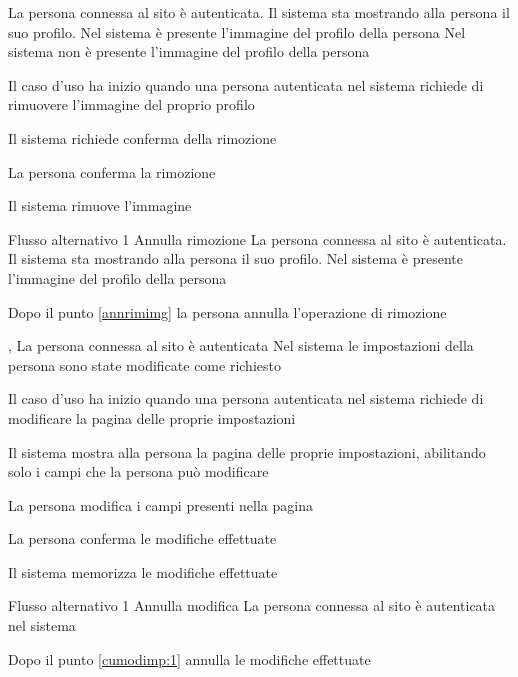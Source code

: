 {}
{La persona connessa al sito è autenticata. Il sistema sta mostrando alla persona il suo profilo. Nel sistema è presente l'immagine del profilo della persona}
{Nel sistema non è presente l'immagine del profilo della persona}
{\begin{enumCU}
	\item Il caso d'uso ha inizio quando una persona autenticata nel sistema richiede di rimuovere l'immagine del proprio profilo
	\item Il sistema richiede conferma della rimozione\label{annrimimg}
	\item La persona conferma la rimozione
	\item Il sistema rimuove l'immagine
\end{enumCU}}
%
{Flusso alternativo 1}%
{Annulla rimozione}%
{La persona connessa al sito è autenticata. Il sistema sta mostrando alla persona il suo profilo. Nel sistema è presente l'immagine del profilo della persona}
{\postNulle}%
{\begin{enumCU}
		\item Dopo il punto \ref{annrimimg} la persona annulla l'operazione di rimozione
	\end{enumCU}}%


{, }
{La persona connessa al sito è autenticata}
{Nel sistema le impostazioni della persona sono state modificate come richiesto}   
{\begin{enumCU}
	\item Il caso d'uso ha inizio quando una persona autenticata nel sistema richiede di modificare la pagina delle proprie impostazioni
	\item Il sistema mostra alla persona la pagina delle proprie impostazioni, abilitando solo i campi che la persona può modificare
	\item La persona modifica i campi presenti nella pagina\label{cumodimp:1}
	\item La persona conferma le modifiche effettuate 
	\item Il sistema memorizza le modifiche effettuate
\end{enumCU}
}
%
{Flusso alternativo 1}%
{Annulla modifica}%
{La persona connessa al sito è autenticata nel sistema}%
{\postNulle}%
{\begin{enumCU}
		\item Dopo il punto \ref{cumodimp:1} annulla le modifiche effettuate
	\end{enumCU}}%

